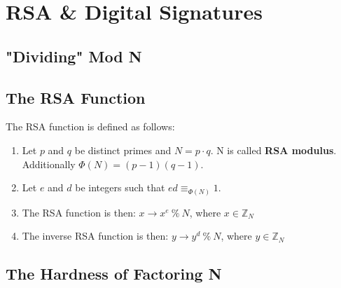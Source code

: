 \documentclass{article}
\begin{document}
		\section{RSA \& Digital Signatures}
		\begin{adjustwidth}{2em}{2em}
			\subsection{"Dividing" Mod N}
			\begin{adjustwidth}{2em}{2em}
			\end{adjustwidth}
			\subsection{The RSA Function}
			\begin{adjustwidth}{2em}{2em}
				The RSA function is defined as follows:
				\begin{enumerate}
					\item Let $p$ and $q$ be distinct primes and $N = p \cdot q$. N is called \textbf{RSA modulus}. \\
					Additionally $\Phi(N) = (p-1)(q-1)$.
					\item Let $e$ and $d$ be integers such that $ed \equiv_{\Phi(N)} 1$.
					\item The RSA function is then: $x \rightarrow x^{e} \ \% \ N$, where $x \in \mathbb{Z}_N$
					\item The inverse RSA function is then: $y \rightarrow y^{d} \ \% \ N$, where $y \in \mathbb{Z}_N$
				\end{enumerate}
			\end{adjustwidth}
			\subsection{The Hardness of Factoring N}
			\begin{adjustwidth}{2em}{2em}
			\end{adjustwidth}
		\end{adjustwidth}
\end{document}
